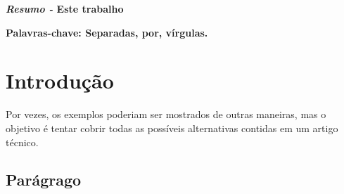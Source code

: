\documentclass[10pt, twocolumn]{article} %
\begin{document}

\par \textbf{\textit{Resumo - }Este trabalho }
\vspace{0.25cm}
\par \textbf{Palavras-chave: Separadas, por, vírgulas.}

\section{Introdução}
\par  
\par Por vezes, os exemplos
poderiam ser mostrados de outras maneiras, mas o
objetivo é tentar cobrir todas as possíveis alternativas
contidas em um artigo técnico.

\subsection{Parágrago}
\end{document}
